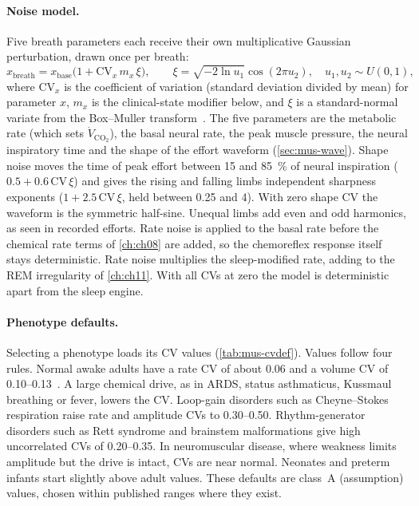 \paragraph{Noise model.} Five breath parameters each receive their own multiplicative Gaussian perturbation, drawn once per breath:
\begin{equation}
x_{\mathrm{breath}}=x_{\mathrm{base}}\bigl(1+\mathrm{CV}_x\,m_x\,\xi\bigr),\qquad
\xi=\sqrt{-2\ln u_1}\cos(2\pi u_2),\quad u_1,u_2\sim U(0,1),
\label{eq:mus-cv}
\end{equation}
where $\mathrm{CV}_x$ is the coefficient of variation (standard deviation divided by mean) for parameter $x$, $m_x$ is the clinical-state modifier below, and $\xi$ is a standard-normal variate from the Box--Muller transform~\citep{box1958}. The five parameters are the metabolic rate (which sets $\dot V_{\mathrm{CO_2}}$), the basal neural rate, the peak muscle pressure, the neural inspiratory time and the shape of the effort waveform (\cref{sec:mus-wave}). Shape noise moves the time of peak effort between 15 and \SI{85}{\percent} of neural inspiration ($0.5+0.6\,\mathrm{CV}\,\xi$) and gives the rising and falling limbs independent sharpness exponents ($1+2.5\,\mathrm{CV}\,\xi$, held between 0.25 and 4). With zero shape CV the waveform is the symmetric half-sine. Unequal limbs add even and odd harmonics, as seen in recorded efforts. Rate noise is applied to the basal rate before the chemical rate terms of \cref{ch:ch08} are added, so the chemoreflex response itself stays deterministic. Rate noise multiplies the sleep-modified rate, adding to the REM irregularity of \cref{ch:ch11}. With all CVs at zero the model is deterministic apart from the sleep engine.

\paragraph{Phenotype defaults.} Selecting a phenotype loads its CV values (\cref{tab:mus-cvdef}). Values follow four rules. Normal awake adults have a rate CV of about 0.06 and a volume CV of 0.10--0.13~\citep{wysocki2006}. A large chemical drive, as in ARDS, status asthmaticus, Kussmaul breathing or fever, lowers the CV. Loop-gain disorders such as Cheyne--Stokes respiration raise rate and amplitude CVs to 0.30--0.50. Rhythm-generator disorders such as Rett syndrome and brainstem malformations give high uncorrelated CVs of 0.20--0.35. In neuromuscular disease, where weakness limits amplitude but the drive is intact, CVs are near normal. Neonates and preterm infants start slightly above adult values. These defaults are class~A (assumption) values, chosen within published ranges where they exist.

